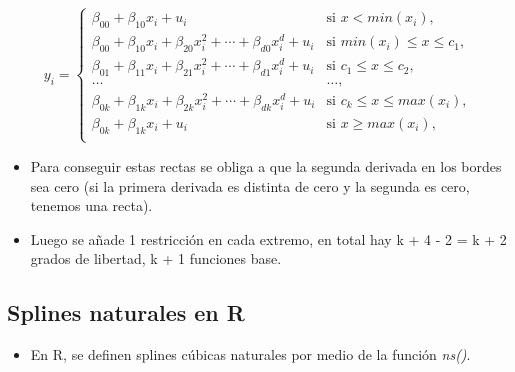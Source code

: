 \documentclass[
]{article}
\newenvironment{Shaded}{\begin{snugshade}}{\end{snugshade}}
\newcommand{\DataTypeTok}[1]{\textcolor[rgb]{0.13,0.29,0.53}{#1}}
\newcommand{\DecValTok}[1]{\textcolor[rgb]{0.00,0.00,0.81}{#1}}
\newcommand{\KeywordTok}[1]{\textcolor[rgb]{0.13,0.29,0.53}{\textbf{#1}}}
\newcommand{\NormalTok}[1]{#1}
\newcommand{\OperatorTok}[1]{\textcolor[rgb]{0.81,0.36,0.00}{\textbf{#1}}}
\providecommand{\tightlist}{%
  \setlength{\itemsep}{0pt}\setlength{\parskip}{0pt}}
\begin{document}
\[
\begin{equation*}
y_i = \left\{
\begin{array}{cl}
\beta_{00} + \beta_{10} x_i + u_i & \text{si } x < min(x_i),\\
\beta_{00} + \beta_{10} x_i + \beta_{20} x_i^2 + \cdots + \beta_{d0} x_i^d + u_i & \text{si } min(x_i) \leq x \leq c_1, \\
\beta_{01} + \beta_{11} x_i + \beta_{21} x_i^2 + \cdots + \beta_{d1} x_i^d + u_i & \text{si } c_1 \leq x \leq c_2, \\
\ldots & \ldots, \\
\beta_{0k} + \beta_{1k} x_i + \beta_{2k} x_i^2 + \cdots + \beta_{dk} x_i^d + u_i & \text{si } c_k \leq x \leq max(x_i), \\
\beta_{0k} + \beta_{1k} x_i + u_i & \text{si } x \geq max(x_i), \\
\end{array} \right.
\end{equation*}
\]

\begin{itemize}
\item
  Para conseguir estas rectas se obliga a que la segunda derivada en los
  bordes sea cero (si la primera derivada es distinta de cero y la
  segunda es cero, tenemos una recta).
\item
  Luego se añade 1 restricción en cada extremo, en total hay k + 4 - 2 =
  k + 2 grados de libertad, k + 1 funciones base.
\end{itemize}

\hypertarget{splines-naturales-en-r}{%
\subsection{Splines naturales en R}\label{splines-naturales-en-r}}

\begin{itemize}
\tightlist
\item
  En R, se definen splines cúbicas naturales por medio de la función
  \emph{ns()}.
\end{itemize}

\begin{Shaded}
\end{Shaded}
\end{document}
